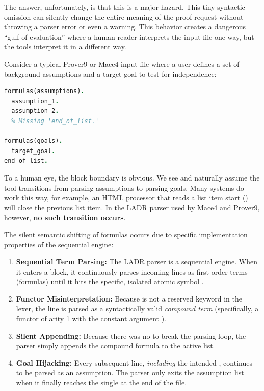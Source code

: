 The answer, unfortunately, is that this is a major hazard. This tiny syntactic omission can silently change the entire meaning of the proof request without throwing a parser error or even a warning. This behavior creates a dangerous ``gulf of evaluation'' where a human reader interprets the input file one way, but the tools interpret it in a different way.

Consider a typical Prover9 or Mace4 input file where a user defines a set of background assumptions and a target goal to test for independence:

\noindent
\begin{minipage}{\columnwidth}
\begin{lstlisting}[language=Prolog, caption={A problematic LADR input block containing a missing boundary separator.}]
formulas(assumptions).
  assumption_1.
  assumption_2.
  % Missing 'end_of_list.'

formulas(goals).
  target_goal.
end_of_list.
\end{lstlisting}
\end{minipage}

To a human eye, the block boundary is obvious. We see  and naturally assume the tool transitions from parsing assumptions to parsing goals. Many systems do work this way, for example, an HTML processor that reads a list item start () will close the previous list item. In the LADR parser used by Mace4 and Prover9, however, \textbf{no such transition occurs}.

The silent semantic shifting of formulas occurs due to specific implementation properties of the sequential engine:

\begin{enumerate}
    \item \textbf{Sequential Term Parsing:} The LADR parser is a sequential engine. When it enters a  block, it continuously parses incoming lines as first-order terms (formulas) until it hits the specific, isolated atomic symbol .
    \item \textbf{Functor Misinterpretation:} Because  is not a reserved keyword in the lexer, the line  is parsed as a syntactically valid \emph{compound term} (specifically, a functor of arity 1 with the constant argument ).
    \item \textbf{Silent Appending:} Because there was no  to break the parsing loop, the parser simply appends the compound formula  to the active  list.
    \item \textbf{Goal Hijacking:} Every subsequent line, \emph{including} the intended , continues to be parsed as an assumption. The parser only exits the assumption list when it finally reaches the single  at the end of the file.
\end{enumerate}

